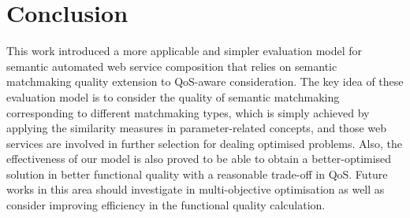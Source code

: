 \documentclass{llncs}
\begin{document}
\section{Conclusion}\label{conclusion}
This work introduced a more applicable and simpler evaluation model for semantic automated web service composition that relies on semantic matchmaking quality extension to QoS-aware consideration. The key idea of these evaluation model is to consider the quality of semantic matchmaking corresponding to different matchmaking types, which is simply achieved by applying the similarity measures in parameter-related concepts, and those web services are involved in further selection for dealing optimised problems. Also, the effectiveness of our model is also proved to be able to obtain a better-optimised solution in better functional quality with a reasonable trade-off in QoS. Future works in this area should investigate in multi-objective optimisation as well as consider improving efficiency in the functional quality calculation.


\end{document}
